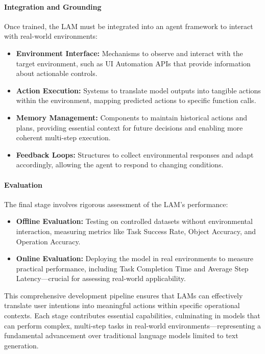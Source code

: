 \documentclass[journal,twoside,10pt]{IEEEtran}
\begin{document}
\paragraph{Integration and Grounding}
Once trained, the LAM must be integrated into an agent framework to interact with real-world environments:

\begin{itemize}
    \item \textbf{Environment Interface:} Mechanisms to observe and interact with the target environment, such as UI Automation APIs that provide information about actionable controls.
    
    \item \textbf{Action Execution:} Systems to translate model outputs into tangible actions within the environment, mapping predicted actions to specific function calls.
    
    \item \textbf{Memory Management:} Components to maintain historical actions and plans, providing essential context for future decisions and enabling more coherent multi-step execution.
    
    \item \textbf{Feedback Loops:} Structures to collect environmental responses and adapt accordingly, allowing the agent to respond to changing conditions.
\end{itemize}

\paragraph{Evaluation}
The final stage involves rigorous assessment of the LAM's performance:

\begin{itemize}
    \item \textbf{Offline Evaluation:} Testing on controlled datasets without environmental interaction, measuring metrics like Task Success Rate, Object Accuracy, and Operation Accuracy.
    
    \item \textbf{Online Evaluation:} Deploying the model in real environments to measure practical performance, including Task Completion Time and Average Step Latency—crucial for assessing real-world applicability.
\end{itemize}

This comprehensive development pipeline ensures that LAMs can effectively translate user intentions into meaningful actions within specific operational contexts. Each stage contributes essential capabilities, culminating in models that can perform complex, multi-step tasks in real-world environments—representing a fundamental advancement over traditional language models limited to text generation.
\end{document}
